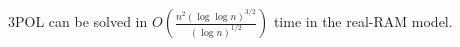 \begin{contribution}[label=thm:implicit:uniform,restate=TheoremPOLUniformImplicit]%
3POL can be solved in
$O(\frac{n^2 {(\log \log n)}^{3/2}}{{(\log n)}^{1/2}})$
time in the real-RAM model.
\end{contribution}
